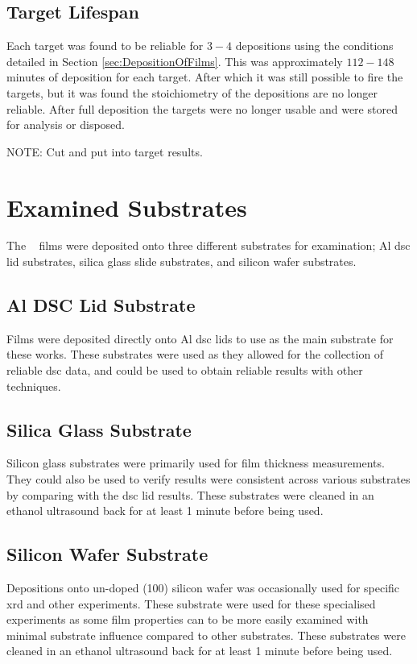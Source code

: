 \documentclass[a4paper,12pt,oneside]{report}%
\begin{document}
\subsection{Target Lifespan}
Each target was found to be reliable for $3-4$ depositions using the conditions detailed in Section \ref{sec:DepositionOfFilms}. This was approximately $112-148$ minutes of deposition for each target. After which it was still possible to fire the targets, but it was found the stoichiometry of the depositions are no longer reliable. After full deposition the targets were no longer usable and were stored for analysis or disposed. 

NOTE: Cut and put into target results. 

\section{Examined Substrates} 
The \MgZnCa~ films were deposited onto three different substrates for examination; Al \acrshort{dsc} lid substrates, silica glass slide substrates, and silicon wafer substrates.

\subsection{Al DSC Lid Substrate}
Films were deposited directly onto Al \gls{dsc} lids to use as the main substrate for these works. These substrates were used as they allowed for the collection of reliable \gls{dsc} data, and could be used to obtain reliable results with other techniques. 

\subsection{Silica Glass Substrate}
Silicon glass substrates were primarily used for film thickness measurements. They could also be used to verify results were consistent across various substrates by comparing with the \gls{dsc} lid results. These substrates were cleaned in an ethanol ultrasound back for at least 1 minute before being used. 

\subsection{Silicon Wafer Substrate}
Depositions onto un-doped (100) silicon wafer was occasionally used for specific \gls{xrd} and other experiments. These substrate were used for these specialised experiments as some film properties can to be more easily examined with minimal substrate influence compared to other substrates. These substrates were cleaned in an ethanol ultrasound back for at least 1 minute before being used. 
\end{document}
